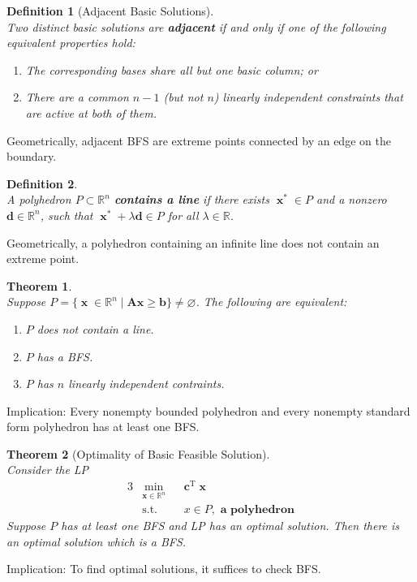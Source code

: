 \documentclass[12pt]{article}
\newcommand{\st}{\mathrm{s.t.}}
\newcommand{\T}{\mathrm{T}}
\newtheorem{definition}{Definition}[section]
\newtheorem{theorem}{Theorem}[section]
\theoremstyle{definition}
\DeclareMathOperator{\x}{\mathbf{x}}
\begin{document}
\begin{definition}[Adjacent Basic Solutions]
\hfill\\\normalfont Two distinct basic solutions are \textbf{adjacent} \textit{if and only if} one of the following \textit{equivalent} properties hold:
\begin{enumerate}
  \item The corresponding bases share all but one basic column; or
  \item There are a common $n-1$ (but not $n$) linearly independent constraints that are active at both of them. 
\end{enumerate}
\end{definition}
Geometrically, adjacent BFS are extreme points connected by an edge on the boundary.
\begin{definition}
\hfill\\\normalfont A polyhedron $P\subset \mathbb{R}^n$ \textbf{contains a line} if there exists $\x^\ast\in P$ and a nonzero $\mathbf{d}\in \mathbb{R}^n$, such that $\x^\ast+\lambda\mathbf{d}\in P$ for all $\lambda\in \mathbb{R}$. 
\end{definition}
Geometrically, a polyhedron containing an infinite line does not contain an extreme point.
\begin{theorem}
\hfill\\\normalfont Suppose $P=\{\x\in\mathbb{R}^n\mid\mathbf{Ax}\geq\mathbf{b}\}\neq\varnothing$. The following are equivalent:
\begin{enumerate}
  \item $P$ does not contain a line.
  \item $P$ has a BFS.
  \item $P$ has $n$ linearly independent contraints.
\end{enumerate}
\end{theorem}
Implication: Every nonempty bounded polyhedron and every nonempty standard form polyhedron has at least one BFS.
\begin{theorem}[Optimality of Basic Feasible Solution]
\hfill\\\normalfont Consider the LP
\begin{alignat*}{3}
&\min_{\mathbf{x}\in\mathbb{R}^n}&& \mathbf{c}^\T\x\\
&\st&&x\in P, \textbf{ a polyhedron}
\end{alignat*}
Suppose $P$ has at least one BFS and LP has an optimal solution. Then there is an optimal solution which is a BFS.
\end{theorem}
Implication: To find optimal solutions, it suffices to check BFS.
\clearpage
\end{document}
